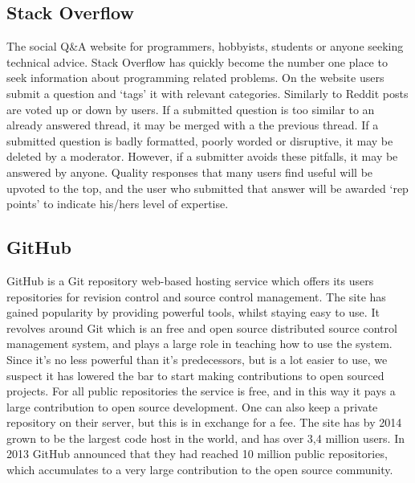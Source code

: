 \documentclass[a4paper,11pt]{article} %
\begin{document}
\subsection{Stack Overflow}

The social Q\&A website for programmers, hobbyists, students or anyone
seeking technical advice. Stack Overflow has quickly become the number one
place to seek information about programming related problems. On the
website users submit a question and ‘tags’ it with relevant categories.
Similarly to Reddit posts are voted up or down by users. If a
submitted question is too similar to an already answered thread, it may be
merged with a the previous thread. If a submitted question is badly formatted,
poorly worded or disruptive, it may be deleted by a moderator.
However, if a submitter avoids these pitfalls, it may be answered by
anyone. Quality responses that many users find useful will be upvoted to the
top, and the user who submitted that answer will be awarded ‘rep points’ to
indicate his/hers level of expertise. 


\subsection{GitHub}

GitHub is a Git repository web-based 
hosting service which offers its users
repositories for revision control and source control management. The site
has gained popularity by providing powerful tools, whilst staying easy to
use. It revolves around Git which is an free and open source distributed
source control management system, and plays a large role in teaching how to
use the system. Since it’s no less powerful than it’s predecessors, but is a
lot easier to use, we suspect it has lowered the bar to start making
contributions to open sourced projects. For all public repositories the
service is free, and in this way it pays a large contribution to open source
development. One can also keep a private repository on their server, but
this is in exchange for a fee. The site has by 2014 grown to be the largest
code host in the world, and has over 3,4 million users. In 2013 GitHub
announced that they had reached 10 million public repositories, which
accumulates to a very large contribution to the open source community.
\end{document}
